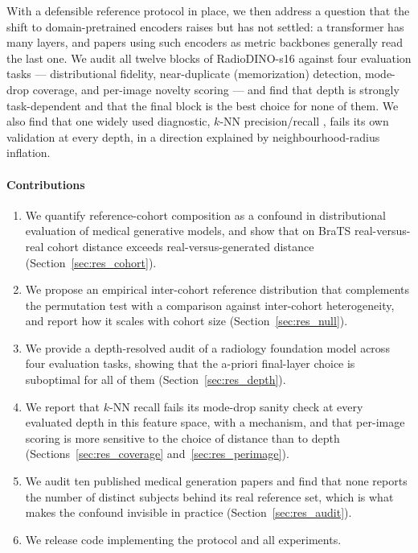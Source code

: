 \documentclass[preprint,12pt,authoryear]{elsarticle}
\begin{document}
With a defensible reference protocol in place, we then address a question that
the shift to domain-pretrained encoders raises but has not settled: a
transformer has many layers, and papers using such encoders as metric backbones
generally read the last one. We audit all twelve blocks of RadioDINO-s16
\citep{perezrad} against four evaluation tasks --- distributional
fidelity, near-duplicate (memorization) detection, mode-drop coverage, and
per-image novelty scoring --- and find that depth is strongly task-dependent and
that the final block is the best choice for none of them. We also find that one
widely used diagnostic, $k$-NN precision/recall
\citep{kynkaanniemi2019pr}, fails its own validation at every depth, in a
direction explained by neighbourhood-radius inflation.

\paragraph{Contributions}
\begin{enumerate}[leftmargin=*, topsep=2pt, itemsep=2pt]
\item We quantify reference-cohort composition as a confound in distributional
      evaluation of medical generative models, and show that on BraTS
      real-versus-real cohort distance exceeds real-versus-generated distance
      (Section~\ref{sec:res_cohort}).
\item We propose an empirical inter-cohort reference distribution that
      complements the permutation test with a comparison against inter-cohort
      heterogeneity,
      and report how it scales with cohort size (Section~\ref{sec:res_null}).
\item We provide a depth-resolved audit of a radiology foundation model across
      four evaluation tasks, showing that the a-priori final-layer choice is
      suboptimal for all of them (Section~\ref{sec:res_depth}).
\item We report that $k$-NN recall fails its mode-drop sanity check at every
      evaluated depth in this feature
      space, with a mechanism, and that per-image scoring is more sensitive to
      the choice of distance than to depth (Sections~\ref{sec:res_coverage}
      and~\ref{sec:res_perimage}).
\item We audit ten published medical generation papers and find that none
      reports the number of distinct subjects behind its real reference set,
      which is what makes the confound invisible in practice
      (Section~\ref{sec:res_audit}).
\item We release code implementing the protocol and all experiments.
\end{enumerate}
\end{document}
